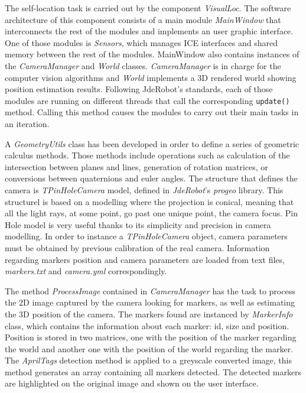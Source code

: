 \documentclass{styles/svproc}
\begin{document}
	The self-location task is carried out by the component \textit{VisualLoc}. The software architecture of this component consists of a main module \textit{MainWindow} that interconnects the rest of the modules and implements an user graphic interface. One of those modules is \textit{Sensors}, which manages ICE interfaces and shared memory between the rest of the modules. MainWindow also contains instances of the \textit{CameraManager} and \textit{World} classes. \textit{CameraManager} is in charge for the computer vision algorithms and \textit{World} implements a 3D rendered world showing position estimation results. Following JdeRobot's standards, each of those modules are running on different threads that call the corresponding \texttt{update()} method. Calling this method causes the modules to carry out their main tasks in an iteration.
	
	A \textit{GeometryUtils} class has been developed in order to define a series of geometric calculus methods. Those methods include operations such as calculation of the intersection between planes and lines, generation of rotation matrices, or conversions between quaternions and euler angles. The structure that defines the camera is \textit{TPinHoleCamera} model, defined in \textit{JdeRobot}'s \textit{progeo} library. This structurel is based on a modelling where the projection is conical, meaning that all the light rays, at some point, go past one unique point, the camera focus. Pin Hole model is very useful thanks to its simplicity and precision in camera modelling. In order to instance a \textit{TPinHoleCamera} object, camera parameters must be obtained by previous calibration of the real camera. Information regarding markers position and camera parameters are loaded from text files, \textit{markers.txt} and \textit{camera.yml} correspondingly.
	
	
	
	The method \textit{ProcessImage} contained in \textit{CameraManager} has the task to process the 2D image captured by the camera looking for markers, as well as estimating the 3D position of the camera. The markers found are instanced by \textit{MarkerInfo} class, which contains the information about each marker: id, size and position. Position is stored in two matrices, one with the position of the marker regarding the world and another one with the position of the world regarding the marker. The \textit{AprilTags} detection method is applied to a greyscale converted image, this method generates an array containing all markers detected. The detected markers are highlighted on the original image and shown on the user interface.
	
\end{document}
